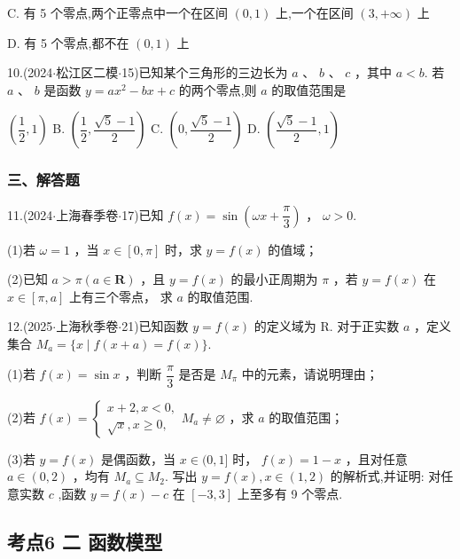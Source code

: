 C. 有 5 个零点,两个正零点中一个在区间 $\left( {0,1}\right)$ 上,一个在区间 $\left( {3, + \infty }\right)$ 上

D. 有 5 个零点,都不在 $\left( {0,1}\right)$ 上

10.(2024$\cdot$松江区二模$\cdot$15)已知某个三角形的三边长为 $a$ 、 $b$ 、 $c$ ，其中 $a < b$. 若 $a$ 、 $b$ 是函数 $y = a{x}^{2} -  {bx} + c$ 的两个零点,则 $a$ 的取值范围是 \dotfill{(\kh{})}

\xx{}{}{}{}$\left( {\dfrac{1}{2},1}\right)$ B. $\left( {\dfrac{1}{2},\dfrac{\sqrt{5} - 1}{2}}\right)$ C. $\left( {0,\dfrac{\sqrt{5} - 1}{2}}\right)$ D. $\left( {\dfrac{\sqrt{5} - 1}{2},1}\right)$

\subsubsection*{三、解答题}

11.(2024$\cdot$上海春季卷$\cdot$17)已知 $f\left( x\right)  = \sin \left( {{\omega x} + \dfrac{\pi }{3}}\right)$ ， $\omega  > 0$.

(1)若 $\omega  = 1$ ，当 $x \in  \left\lbrack  {0,\pi }\right\rbrack$ 时，求 $y = f\left( x\right)$ 的值域；

(2)已知 $a > \pi \left( {a \in  \mathbf{R}}\right)$ ，且 $y = f\left( x\right)$ 的最小正周期为 $\pi$ ，若 $y = f\left( x\right)$ 在 $x \in  \left\lbrack  {\pi ,a}\right\rbrack$ 上有三个零点， 求 $a$ 的取值范围.

12.(2025$\cdot$上海秋季卷$\cdot$21)已知函数 $y = f\left( x\right)$ 的定义域为 R. 对于正实数 $a$ ，定义集合 ${M}_{a} = \{ x \mid  f\left( {x + a}\right)  = f\left( x\right) \}$.

(1)若 $f\left( x\right)  = \sin x$ ，判断 $\dfrac{\pi }{3}$ 是否是 ${M}_{\pi }$ 中的元素，请说明理由；

(2)若 $f\left( x\right)  = \left\{  {\begin{array}{l} x + 2,x < 0, \\  \sqrt{x},x \geq  0, \end{array}{M}_{a} \neq  \varnothing }\right.$ ，求 $a$ 的取值范围；

(3)若 $y = f\left( x\right)$ 是偶函数，当 $x \in  (0,1\rbrack$ 时， $f\left( x\right)  = 1 - x$ ，且对任意 $a \in  \left( {0,2}\right)$ ，均有 ${M}_{a} \subseteq  {M}_{2}$. 写出 $y = f\left( x\right) ,x \in  \left( {1,2}\right)$ 的解析式,并证明: 对任意实数 $c$ ,函数 $y = f\left( x\right)  - c$ 在 $\left\lbrack  {-3,3}\right\rbrack$ 上至多有 9 个零点.

\subsection*{考点6 二 函数模型}

